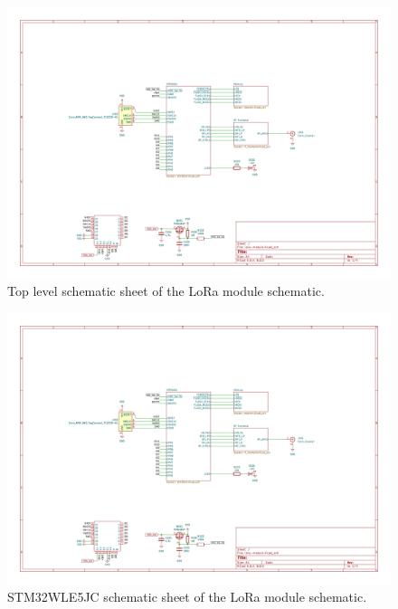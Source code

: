 \begin{figure}
    \includegraphics[page=1,angle=-90,width=\textwidth]{boards/v0.1/lora-module.pdf}
    \caption{\label{schematic:v0.1-1}Top level schematic sheet of the LoRa module schematic.}
\end{figure}
\begin{figure}
    \includegraphics[page=2,angle=-90,width=\textwidth]{boards/v0.1/lora-module.pdf}
    \caption{\label{schematic:v0.1-2}STM32WLE5JC schematic sheet of the LoRa module schematic.}
\end{figure}
